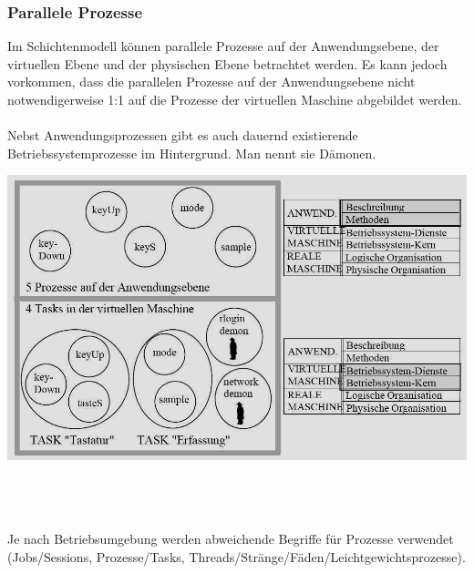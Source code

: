 \subsubsection{Parallele Prozesse}
\begin{minipage}{0.5\textwidth}
    Im Schichtenmodell können parallele Prozesse auf der Anwendungsebene, der virtuellen Ebene und der physischen Ebene betrachtet werden. Es kann jedoch vorkommen, dass die parallelen Prozesse auf der Anwendungsebene nicht notwendigerweise 1:1 auf die Prozesse der virtuellen Maschine abgebildet werden. \\ \\
    Nebst Anwendungsprozessen gibt es auch dauernd existierende Betriebssystemprozesse im Hintergrund. Man nennt sie Dämonen. 
\end{minipage}
\hfill
\begin{minipage}{0.45\textwidth}
    \includegraphics[width=1.0\textwidth]{images/Betriebssysteme/ProzesseAufVerschEbenen.png}
\end{minipage} \\ \\ \\
Je nach Betriebsumgebung werden abweichende Begriffe für Prozesse verwendet (Jobs/Sessions, Prozesse/Tasks, Threads/Stränge/Fäden/Leichtgewichtsprozesse).

